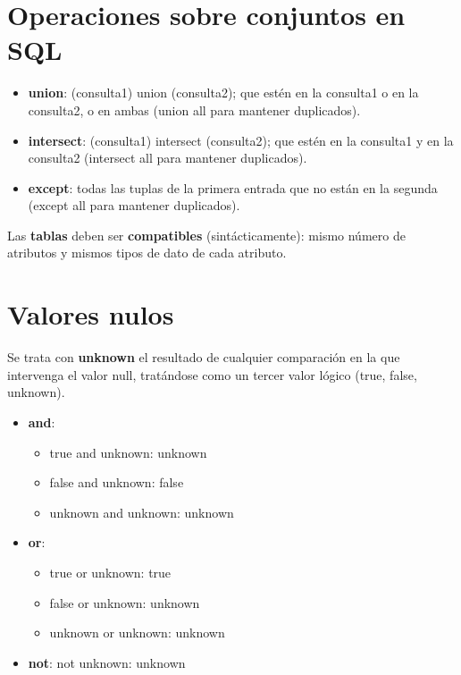 \documentclass{article}
\begin{document}
\section{Operaciones sobre conjuntos en SQL}
\begin{itemize}
    \item \textbf{union}: (consulta1) union (consulta2); que estén en la consulta1 o en la consulta2, o en ambas (union all para mantener duplicados).

    \item \textbf{intersect}: (consulta1) intersect (consulta2); que estén en la consulta1 y en la consulta2 (intersect all para mantener duplicados).

    \item \textbf{except}: todas las tuplas de la primera entrada que no están en la segunda (except all para mantener duplicados). 
\end{itemize}

Las \textbf{tablas} deben ser \textbf{compatibles} (sintácticamente): mismo número de atributos y mismos tipos de dato de cada atributo. 

\section{Valores nulos}
Se trata con \textbf{unknown} el resultado de cualquier comparación en la que intervenga el valor null, tratándose como un tercer valor lógico (true, false, unknown).

\begin{itemize}
    \item \textbf{and}:
    \begin{itemize}
        \item true and unknown: unknown
        \item false and unknown: false
        \item unknown and unknown: unknown
    \end{itemize}

    \item \textbf{or}:
    \begin{itemize}
        \item true or unknown: true
        \item false or unknown: unknown
        \item unknown or unknown: unknown
    \end{itemize}

    \item \textbf{not}: not unknown: unknown
\end{itemize}
\end{document}
